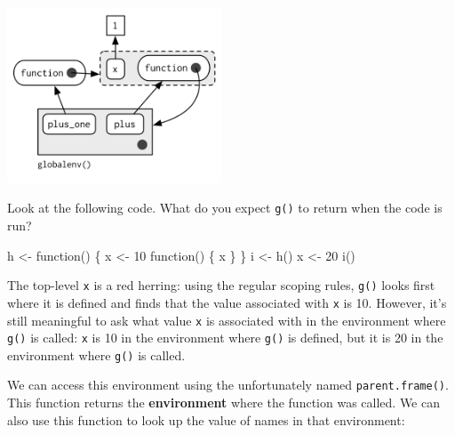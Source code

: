 \documentclass[oneside]{book}
\newenvironment{Shaded}{}{}
\newcommand{\KeywordTok} [1]{\textcolor[rgb]{0.00,0.44,0.13}{{#1}}}
\newcommand{\DecValTok}  [1]{\textcolor[rgb]{0.25,0.63,0.44}{{#1}}}
\newcommand{\StringTok}  [1]{\textcolor[rgb]{0.25,0.44,0.63}{{#1}}}
\newcommand{\NormalTok}  [1]{{#1}}
\begin{document}
\includegraphics[width=2.51in,height=2.06in]{diagrams/environments.png/closure-2.png}


Look at the following code. What do you expect \texttt{g()} to return
when the code is run?

\begin{Shaded}
\begin{Highlighting}[]
\NormalTok{h <-}\StringTok{ }\NormalTok{function() \{}
  \NormalTok{x <-}\StringTok{ }\DecValTok{10}
  \NormalTok{function() \{}
    \NormalTok{x}
  \NormalTok{\}}
\NormalTok{\}}
\NormalTok{i <-}\StringTok{ }\KeywordTok{h}\NormalTok{()}
\NormalTok{x <-}\StringTok{ }\DecValTok{20}
\KeywordTok{i}\NormalTok{()}
\end{Highlighting}
\end{Shaded}

The top-level \texttt{x} is a red herring: using the regular scoping
rules, \texttt{g()} looks first where it is defined and finds that the
value associated with \texttt{x} is 10. However, it's still meaningful
to ask what value \texttt{x} is associated with in the environment where
\texttt{g()} is called: \texttt{x} is 10 in the environment where
\texttt{g()} is defined, but it is 20 in the environment where
\texttt{g()} is called.

We can access this environment using the unfortunately named
\texttt{parent.frame()}. This function returns the \textbf{environment}
where the function was called. We can also use this function to look up
the value of names in that environment:
\end{document}
